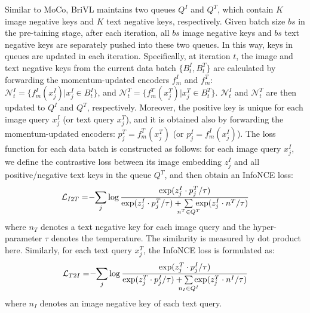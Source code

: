 \documentclass[10pt,twocolumn,letterpaper]{article}
\begin{document}
Similar to MoCo, BriVL maintains two queues $Q^I$ and $Q^T$, which contain $K$ image negative keys and $K$ text negative keys, respectively. Given batch size $bs$ in the pre-taining stage, after each iteration, all $bs$ image negative keys and $bs$ text negative keys are separately pushed into these two queues. In this way, keys in queues are updated in each iteration. Specifically, at iteration $t$, the image and text negative keys from the current data batch $\{B^I_t,B^T_t\}$ are calculated by forwarding the momentum-updated encoders $f^{I}_m$ and $f^{T}_m$: $\mathcal{N}_t^I = \{f_m^I(x_j^I)|x_j^I \in B^I_t\}$, and $\mathcal{N}_t^T = \{f_m^T(x_j^T)|x_j^T \in B^T_t\}$. $\mathcal{N}_t^I$ and $\mathcal{N}_t^T$ are then updated to $Q^I$ and $Q^T$, respectively. Moreover, the positive key is unique for each image query $x_j^I$ (or text query $x_j^T$), and it is obtained also by forwarding the momentum-updated encoders: $p_j^T = f_m^T(x_j^T)$ (or $p_j^I = f_m^I(x_j^I)$). The loss function for each data batch is constructed as follows: for each image query $x_j^I$, we define the contrastive loss between its image embedding $z_j^I$ and all positive/negative text keys in the queue $Q^T$, and then obtain an InfoNCE loss:
\begin{equation}
\mathcal{L}_{I2T} = \hspace{-0.03in}  - \hspace{-0.03in} \sum_{j}\log\frac{ \exp(z_j^I\cdot p_j^T / \tau)}{ \exp(z_j^I\cdot p_j^T / \tau) + \hspace{-0.1in}   \sum\limits_{n^T \in Q^T} \hspace{-0.1in} \exp(z_j^I \cdot n^T / \tau)}   \end{equation}
where $n_T$ denotes a text negative key for each image query and the hyper-parameter $\tau$ denotes the temperature. The similarity is measured by dot product here. Similarly, for each text query $x_j^T$, the InfoNCE loss is formulated as:
\begin{equation}
\mathcal{L}_{T2I} = \hspace{-0.03in}  - \hspace{-0.03in} \sum_{j}\log\frac{ \exp(z_j^T\cdot p_j^I / \tau)}{ \exp(z_j^T\cdot p_j^I / \tau) + \hspace{-0.1in}   \sum\limits_{n_I \in Q^I} \hspace{-0.1in} \exp(z_j^T \cdot n^I / \tau)}   \end{equation}
where $n_I$ denotes an image negative key of each text query.
\end{document}
